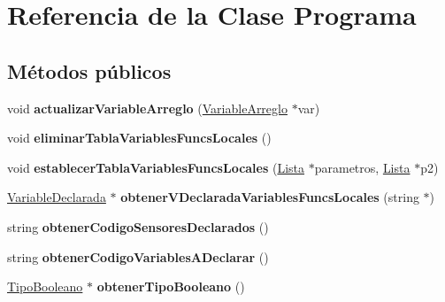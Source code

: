 \hypertarget{class_programa}{\section{Referencia de la Clase Programa}
\label{class_programa}
}
\subsection*{Métodos públicos}
\begin{DoxyCompactItemize}
\item 
\hypertarget{class_programa_af659ea1395508d314d38ae9e4a1810c8}{void {\bfseries actualizar\-Variable\-Arreglo} (\hyperlink{class_variable_arreglo}{Variable\-Arreglo} $\ast$var)}\label{class_programa_af659ea1395508d314d38ae9e4a1810c8}

\item 
\hypertarget{class_programa_adcc8d19595a93cd41e5148589ef4600b}{void {\bfseries eliminar\-Tabla\-Variables\-Funcs\-Locales} ()}\label{class_programa_adcc8d19595a93cd41e5148589ef4600b}

\item 
\hypertarget{class_programa_a3365cc53aa7a733b8d9d99c813f6c897}{void {\bfseries establecer\-Tabla\-Variables\-Funcs\-Locales} (\hyperlink{class_lista}{Lista} $\ast$parametros, \hyperlink{class_lista}{Lista} $\ast$p2)}\label{class_programa_a3365cc53aa7a733b8d9d99c813f6c897}

\item 
\hypertarget{class_programa_acf9e779a8265278fb90d9cb9c4f1d4a6}{\hyperlink{class_variable_declarada}{Variable\-Declarada} $\ast$ {\bfseries obtener\-V\-Declarada\-Variables\-Funcs\-Locales} (string $\ast$)}\label{class_programa_acf9e779a8265278fb90d9cb9c4f1d4a6}

\item 
\hypertarget{class_programa_ab6b962e2bab0340f2a30de99c22dc19d}{string {\bfseries obtener\-Codigo\-Sensores\-Declarados} ()}\label{class_programa_ab6b962e2bab0340f2a30de99c22dc19d}

\item 
\hypertarget{class_programa_af4d3ed3f28acf78aff460031d53f4b74}{string {\bfseries obtener\-Codigo\-Variables\-A\-Declarar} ()}\label{class_programa_af4d3ed3f28acf78aff460031d53f4b74}

\item 
\hypertarget{class_programa_ae19984e7598f4faa075ebf48fa818596}{\hyperlink{class_tipo_booleano}{Tipo\-Booleano} $\ast$ {\bfseries obtener\-Tipo\-Booleano} ()}\label{class_programa_ae19984e7598f4faa075ebf48fa818596}


\end{DoxyCompactItemize}

